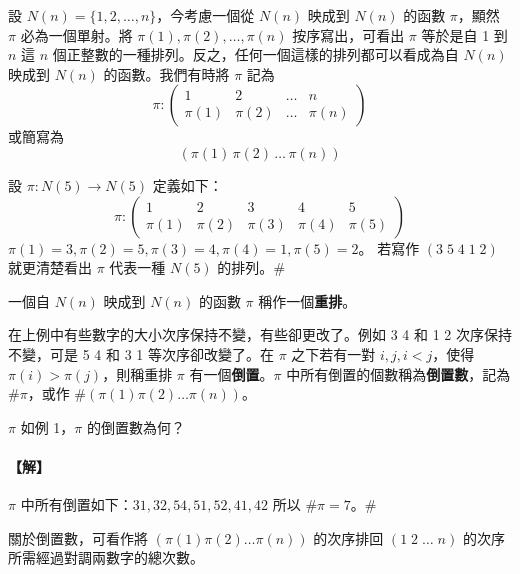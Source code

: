 設 $N(n) = \{ 1, 2, \dots, n \}$，今考慮一個從 $N(n)$ 映成到 $N(n)$ 的函數 $\pi$，顯然 $\pi$ 必為一個單射。將 $\pi(1), \pi(2), \dots, \pi(n)$ 按序寫出，可看出 $\pi$ 等於是自 1 到 $n$ 這 $n$ 個正整數的一種排列。反之，任何一個這樣的排列都可以看成為自 $N(n)$ 映成到 $N(n)$ 的函數。我們有時將 $\pi$ 記為
\begin{equation}
\pi : \begin{pmatrix} 1 & 2 & \dots & n \\ \pi(1) & \pi(2) & \dots & \pi(n) \end{pmatrix} \label{eq:b6-1-3-2}
\end{equation}
或簡寫為
\begin{equation}
(\pi(1) \, \pi(2) \, \dots \, \pi(n)) \tag{2'} \label{eq:b6-1-3-2p}
\end{equation}

\begin{example}\label{ex:b6-1-12}
設 $\pi: N(5) \longrightarrow N(5)$ 定義如下：
\[ \pi : \begin{pmatrix} 1 & 2 & 3 & 4 & 5 \\ \pi(1) & \pi(2) & \pi(3) & \pi(4) & \pi(5) \end{pmatrix} \]
$\pi(1)=3, \pi(2)=5, \pi(3)=4, \pi(4)=1, \pi(5)=2$。
若寫作 $(3 \; 5 \; 4 \; 1 \; 2)$ 就更清楚看出 $\pi$ 代表一種 $N(5)$ 的排列。\hfill$\#$
\end{example}

\begin{definition}\label{def:b6-1-6}
一個自 $N(n)$ 映成到 $N(n)$ 的函數 $\pi$ 稱作一個\textbf{重排}。
\end{definition}

在上例中有些數字的大小次序保持不變，有些卻更改了。例如 3 4 和 1 2 次序保持不變，可是 5 4 和 3 1 等次序卻改變了。在 $\pi$ 之下若有一對 $i, j, i < j$，使得 $\pi(i) > \pi(j)$，則稱重排 $\pi$ 有一個\textbf{倒置}。$\pi$ 中所有倒置的個數稱為\textbf{倒置數}，記為 $\#\pi$，或作 $\#(\pi(1)\pi(2)\dots\pi(n))$。

\begin{example}\label{ex:b6-1-13}
$\pi$ 如例 1，$\pi$ 的倒置數為何？
\end{example}

\paragraph{【解】}
$\pi$ 中所有倒置如下：$31, 32, 54, 51, 52, 41, 42$ 所以 $\#\pi = 7$。\hfill$\#$

關於倒置數，可看作將 $(\pi(1)\pi(2)\dots\pi(n))$ 的次序排回 $(1 \; 2 \; \dots \; n)$ 的次序所需經過對調兩數字的總次數。

